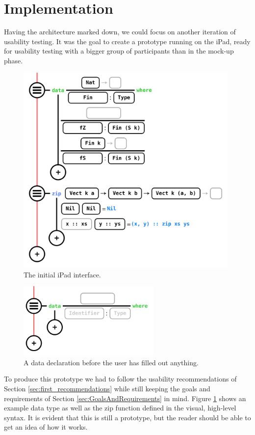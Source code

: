 \section{Implementation}
\label{sec:Implementation}

Having the architecture marked down, we could focus on another iteration of
usability testing. It was the goal to create a prototype running on the iPad,
ready for usability testing with a bigger group of participants than in the
mock-up phase.

\begin{figure}
	\centering
		\includegraphics[width=110mm]{diagrams/ipad_interface.PNG}
	\caption{The initial iPad interface.}
	\label{fig:initialiPadInterface}
\end{figure}

\begin{figure}
	\centering
		\includegraphics[width=70mm]{diagrams/data_declaration.png}
	\caption{A data declaration before the user has filled out anything.}
	\label{fig:data_declaration}
\end{figure}

To produce this prototype we had to follow the usability recommendations of
Section \ref{sec:first_recommendations}	while still keeping the goals and requirements of
Section \ref{sec:GoalsAndRequirements} in mind. Figure \ref{fig:initialiPadInterface}
shows an example data type as well as the zip function defined in the visual,
high-level syntax. It is evident that this is still a prototype, but the reader
should be able to get an idea of how it works.

